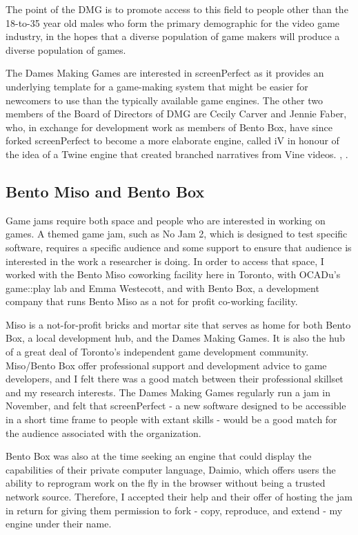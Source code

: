 The point of the DMG is to promote access to this field to people other than the 18-to-35 year old males who form the primary demographic for the video game industry, in the hopes that a diverse population of game makers will produce a diverse population of games. 

The Dames Making Games are interested in screenPerfect as it provides an underlying template for a game-making system that might be easier for newcomers to use than the typically available game engines. The other two members of the Board of Directors of DMG are Cecily Carver and Jennie Faber, who, in exchange for development work as members of Bento Box, have since forked screenPerfect to become a more elaborate engine, called iV in honour of the idea of a Twine engine that created branched narratives from Vine videos. \parencite{iv}, \parencite{twine}.

\subsection{Bento Miso and Bento Box}
Game jams require both space and people who are interested in working on games. A themed game jam, such as No Jam 2, which is designed to test specific software, requires a specific audience and some support to ensure that audience is interested in the work a researcher is doing. In order to access that space, I worked with the Bento Miso coworking facility here in Toronto, with OCADu's game::play lab and Emma Westecott, and with Bento Box, a development company that runs Bento Miso as a not for profit co-working facility. 

Miso is a not-for-profit bricks and mortar site that serves as home for both Bento Box, a local development hub, and the Dames Making Games. It is also the hub of a great deal of Toronto's independent game development community. Miso/Bento Box offer professional support and development advice to game developers, and I felt there was a good match between their professional skillset and my research interests. The Dames Making Games regularly run a jam in November, and felt that screenPerfect - a new software designed to be accessible in a short time frame to people with extant skills - would be a good match for the audience associated with the organization.

Bento Box was also at the time seeking an engine that could display the capabilities of their private computer language, Daimio, which offers users the ability to reprogram work on the fly in the browser without being a trusted network source. Therefore, I accepted their help and their offer of hosting the jam in return for giving them permission to fork - copy, reproduce, and extend - my engine under their name.

